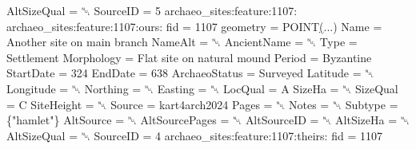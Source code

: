 \documentclass[
  letterpaper,
  DIV=11,
  numbers=noendperiod]{scrartcl}
\newenvironment{Shaded}{\begin{snugshade}}{\end{snugshade}}
\newcommand{\ErrorTok}[1]{\textcolor[rgb]{1.00,0.33,0.33}{\underline{#1}}}
\newcommand{\ExtensionTok}[1]{\textcolor[rgb]{0.55,0.91,0.99}{#1}}
\newcommand{\KeywordTok}[1]{\textcolor[rgb]{1.00,0.47,0.78}{#1}}
\newcommand{\NormalTok}[1]{\textcolor[rgb]{0.97,0.97,0.95}{#1}}
\newcommand{\StringTok}[1]{\textcolor[rgb]{0.95,0.98,0.55}{#1}}
\begin{document}
\begin{tcolorbox}
\begin{Shaded}
\begin{Highlighting}[]
                             \ExtensionTok{AltSizeQual}\NormalTok{ = ␀}
                                \ExtensionTok{SourceID}\NormalTok{ = 5}
        \ExtensionTok{archaeo\_sites:feature:1107:}
            \ExtensionTok{archaeo\_sites:feature:1107:ours:}
                                     \ExtensionTok{fid}\NormalTok{ = 1107}
                                \ExtensionTok{geometry}\NormalTok{ = POINT}\ErrorTok{(}\ExtensionTok{...}\KeywordTok{)}
                                    \ExtensionTok{Name}\NormalTok{ = Another site on main branch}
                                 \ExtensionTok{NameAlt}\NormalTok{ = ␀}
                             \ExtensionTok{AncientName}\NormalTok{ = ␀}
                                    \ExtensionTok{Type}\NormalTok{ = Settlement}
                              \ExtensionTok{Morphology}\NormalTok{ = Flat site on natural mound}
                                  \ExtensionTok{Period}\NormalTok{ = Byzantine}
                               \ExtensionTok{StartDate}\NormalTok{ = 324}
                                 \ExtensionTok{EndDate}\NormalTok{ = 638}
                           \ExtensionTok{ArchaeoStatus}\NormalTok{ = Surveyed}
                                \ExtensionTok{Latitude}\NormalTok{ = ␀}
                               \ExtensionTok{Longitude}\NormalTok{ = ␀}
                                \ExtensionTok{Northing}\NormalTok{ = ␀}
                                 \ExtensionTok{Easting}\NormalTok{ = ␀}
                                 \ExtensionTok{LocQual}\NormalTok{ = A}
                                  \ExtensionTok{SizeHa}\NormalTok{ = ␀}
                                \ExtensionTok{SizeQual}\NormalTok{ = C}
                              \ExtensionTok{SiteHeight}\NormalTok{ = ␀}
                                  \ExtensionTok{Source}\NormalTok{ = kart4arch2024}
                                   \ExtensionTok{Pages}\NormalTok{ = ␀}
                                   \ExtensionTok{Notes}\NormalTok{ = ␀}
                                 \ExtensionTok{Subtype}\NormalTok{ = \{}\StringTok{"hamlet"}\NormalTok{\}}
                               \ExtensionTok{AltSource}\NormalTok{ = ␀}
                          \ExtensionTok{AltSourcePages}\NormalTok{ = ␀}
                             \ExtensionTok{AltSourceID}\NormalTok{ = ␀}
                               \ExtensionTok{AltSizeHa}\NormalTok{ = ␀}
                             \ExtensionTok{AltSizeQual}\NormalTok{ = ␀}
                                \ExtensionTok{SourceID}\NormalTok{ = 4}
            \ExtensionTok{archaeo\_sites:feature:1107:theirs:}
                                     \ExtensionTok{fid}\NormalTok{ = 1107}

\end{Highlighting}
\end{Shaded}
\end{tcolorbox}
\end{document}

